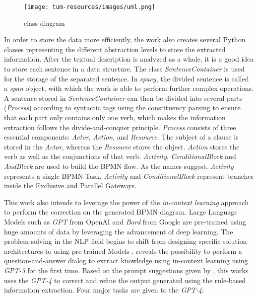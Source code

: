\begin{figure}[h]
    \centering
    \caption{class diagram}
    \label{class_diagram}
    \texttt{[image: tum-resources/images/uml.png]}
\end{figure}

In order to store the data more efficiently, the work also creates several Python classes representing the different abstraction levels to store the extracted information. After the textual description is analyzed as a whole, it is a good idea to store each sentence in a data structure. The class \textit{SentenceContainer} is used for the storage of the separated sentence. In \textit{spacy}, the divided sentence is called a \textit{span} object, with which the work is able to perform further complex operations. A sentence stored in \textit{SentenceContainer} can then be divided into several parts (\textit{Process}) according to syntactic tags using the constituency parsing to ensure that each part only contains only one verb, which makes the information extraction follows the divide-and-conquer principle. \textit{Process} consists of three essential components: \textit{Actor}, \textit{Action}, and \textit{Resource}. The subject of a clause is stored in the \textit{Actor}, whereas the \textit{Resource} stores the object. \textit{Action} stores the verb as well as the conjunctions of that verb. \textit{Activity}, \textit{ConditionalBlock} and \textit{AndBlock} are used to build the BPMN flow. As the names suggest, \textit{Activity} represents a single BPMN Task, \textit{Activity} and \textit{ConditionalBlock} represent branches inside the Exclusive and Parallel Gateways.

This work also intends to leverage the power of the \textit{in-context learning} approach to perform the correction on the generated BPMN diagram. Large Language Models such as \textit{GPT} from OpenAI and \textit{Bard} from Google are pre-trained using huge amounts of data by leveraging the advancement of deep learning. The problem-solving in the NLP field begins to shift from designing specific solution architectures to using pre-trained Models \cite{LLM_2}. \cite{LLM_1} reveals the possibility to perform a question-and-answer dialog to extract knowledge using in-context learning using \textit{GPT-3} for the first time. Based on the prompt suggestions given by \cite{LLM_1}, this works uses the \textit{GPT-4} to correct and refine the output generated using the rule-based information extraction. Four major tasks are given to the \textit{GPT-4}: 

